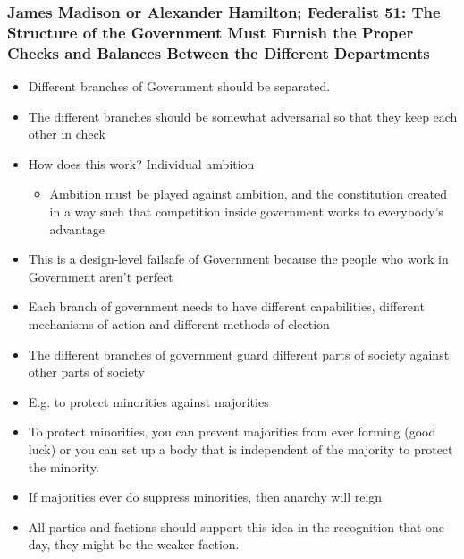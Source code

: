 \documentclass[11pt]{article}
\begin{document}
\subsubsection{James Madison or Alexander Hamilton; Federalist 51: The Structure of the Government Must Furnish the Proper Checks and Balances Between the Different Departments}
\label{sec:orgbd7c327}
\begin{itemize}
\item Different branches of Government should be separated.
\item The different branches should be somewhat adversarial so that they keep each
other in check
\item How does this work? Individual ambition
\begin{itemize}
\item Ambition must be played against ambition, and the constitution created in a
way such that competition inside government works to everybody's advantage
\end{itemize}
\item This is a design-level failsafe of Government because the people who work in
Government aren't perfect
\item Each branch of government needs to have different capabilities, different
mechanisms of action and different methods of election
\item The different branches of government guard different parts of society against
other parts of society
\item E.g. to protect minorities against majorities
\item To protect minorities, you can prevent majorities from ever forming (good
luck) or you can set up a body that is independent of the majority to protect
the minority.
\item If majorities ever do suppress minorities, then anarchy will reign
\item All parties and factions should support this idea in the recognition that one
day, they might be the weaker faction.
\end{itemize}
\end{document}
